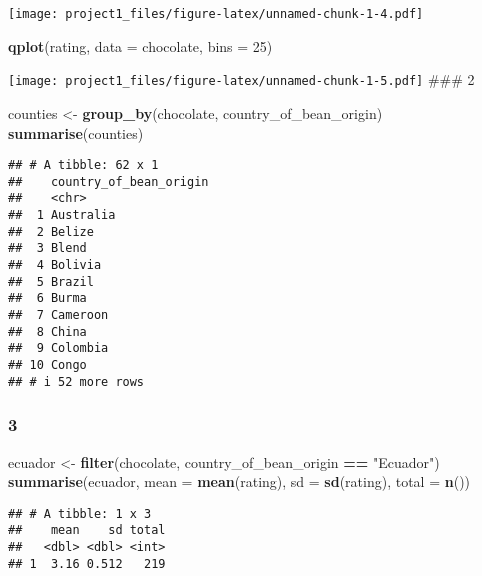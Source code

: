 \documentclass[
]{article}
\newenvironment{Shaded}{\begin{snugshade}}{\end{snugshade}}
\newcommand{\AttributeTok}[1]{\textcolor[rgb]{0.13,0.29,0.53}{#1}}
\newcommand{\DecValTok}[1]{\textcolor[rgb]{0.00,0.00,0.81}{#1}}
\newcommand{\FunctionTok}[1]{\textcolor[rgb]{0.13,0.29,0.53}{\textbf{#1}}}
\newcommand{\NormalTok}[1]{#1}
\newcommand{\OtherTok}[1]{\textcolor[rgb]{0.56,0.35,0.01}{#1}}
\newcommand{\SpecialCharTok}[1]{\textcolor[rgb]{0.81,0.36,0.00}{\textbf{#1}}}
\newcommand{\StringTok}[1]{\textcolor[rgb]{0.31,0.60,0.02}{#1}}
\begin{document}
\texttt{[image: project1\_files/figure-latex/unnamed-chunk-1-4.pdf]}

\begin{Shaded}
\begin{Highlighting}[]
\FunctionTok{qplot}\NormalTok{(rating, }\AttributeTok{data =}\NormalTok{ chocolate, }\AttributeTok{bins =} \DecValTok{25}\NormalTok{)}
\end{Highlighting}
\end{Shaded}

\texttt{[image: project1\_files/figure-latex/unnamed-chunk-1-5.pdf]}
\#\#\# 2

\begin{Shaded}
\begin{Highlighting}[]
\NormalTok{counties }\OtherTok{\textless{}{-}} \FunctionTok{group\_by}\NormalTok{(chocolate, country\_of\_bean\_origin)}
\FunctionTok{summarise}\NormalTok{(counties)}
\end{Highlighting}
\end{Shaded}

\begin{verbatim}
## # A tibble: 62 x 1
##    country_of_bean_origin
##    <chr>                 
##  1 Australia             
##  2 Belize                
##  3 Blend                 
##  4 Bolivia               
##  5 Brazil                
##  6 Burma                 
##  7 Cameroon              
##  8 China                 
##  9 Colombia              
## 10 Congo                 
## # i 52 more rows
\end{verbatim}

\hypertarget{section-1}{%
\subsubsection{3}\label{section-1}}

\begin{Shaded}
\begin{Highlighting}[]
\NormalTok{ecuador }\OtherTok{\textless{}{-}} \FunctionTok{filter}\NormalTok{(chocolate, country\_of\_bean\_origin }\SpecialCharTok{==} \StringTok{"Ecuador"}\NormalTok{)}
\FunctionTok{summarise}\NormalTok{(ecuador, }\AttributeTok{mean =} \FunctionTok{mean}\NormalTok{(rating), }\AttributeTok{sd =} \FunctionTok{sd}\NormalTok{(rating), }\AttributeTok{total =} \FunctionTok{n}\NormalTok{())}
\end{Highlighting}
\end{Shaded}

\begin{verbatim}
## # A tibble: 1 x 3
##    mean    sd total
##   <dbl> <dbl> <int>
## 1  3.16 0.512   219
\end{verbatim}
\end{document}
